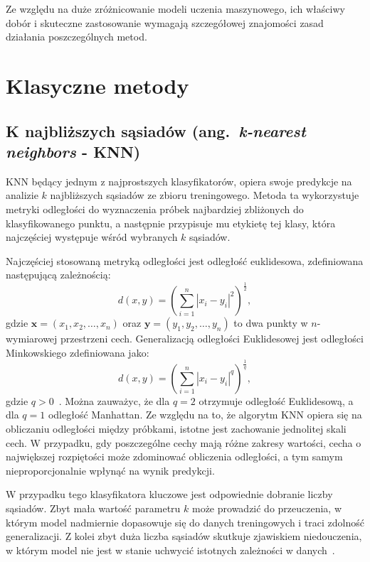 \documentclass[a4paper,twoside,12pt]{book}
\newcommand{\obcy}[1]{\emph{#1}}
\newcommand{\english}[1]{{\selectlanguage{british}\obcy{#1}}}
\begin{document}
Ze względu na duże zróżnicowanie modeli uczenia maszynowego, ich właściwy dobór i skuteczne zastosowanie wymagają szczegółowej znajomości zasad działania poszczególnych metod.
\section{Klasyczne metody}
\label{subsec:metody}
\subsection*{K najbliższych sąsiadów (ang.~\english{k-nearest neighbors} - KNN)}
KNN będący jednym z najprostszych klasyfikatorów, opiera swoje predykcje na analizie $k$ najbliższych sąsiadów ze zbioru treningowego. Metoda ta wykorzystuje metryki odległości do wyznaczenia próbek najbardziej zbliżonych do klasyfikowanego punktu, a następnie przypisuje mu etykietę tej klasy, która najczęściej występuje wśród wybranych $k$ sąsiadów.

Najczęściej stosowaną metryką odległości jest odległość euklidesowa, zdefiniowana następującą zależnością:
\begin{equation}
	d(x, y) = \left( \sum_{i=1}^{n} |x_i - y_i|^{2} \right)^{\frac{1}{2}},
\end{equation}
gdzie $\textbf{x} = (x_1, x_2, \ldots, x_n)$ oraz $\textbf{y} = (y_1, y_2, \ldots, y_n)$ to dwa punkty w $n$-wymiarowej przestrzeni cech. Generalizacją odległości Euklidesowej jest odległości Minkowskiego zdefiniowana jako:
\begin{equation}
	d(x, y) = \left( \sum_{i=1}^{n} |x_i - y_i|^{q} \right)^{\frac{1}{q}},
\end{equation}
gdzie $q>0$~\cite{liu2007web}. Można zauważyc, że dla $q=2$ otrzymuje odległość Euklidesową, a dla $q=1$ odległość Manhattan.
Ze względu na to, że algorytm KNN opiera się na obliczaniu odległości między próbkami, istotne jest zachowanie jednolitej skali cech. W przypadku, gdy poszczególne cechy mają różne zakresy wartości, cecha o największej rozpiętości może zdominować obliczenia odległości, a tym samym nieproporcjonalnie wpłynąć na wynik predykcji.

W przypadku tego klasyfikatora kluczowe jest odpowiednie dobranie liczby sąsiadów. Zbyt mała wartość parametru $k$ może prowadzić do przeuczenia, w którym model nadmiernie dopasowuje się do danych treningowych i traci zdolność generalizacji. Z kolei zbyt duża liczba sąsiadów skutkuje zjawiskiem niedouczenia, w którym model nie jest w stanie uchwycić istotnych zależności w danych~\cite{kuhn2013applied}.
\end{document}
